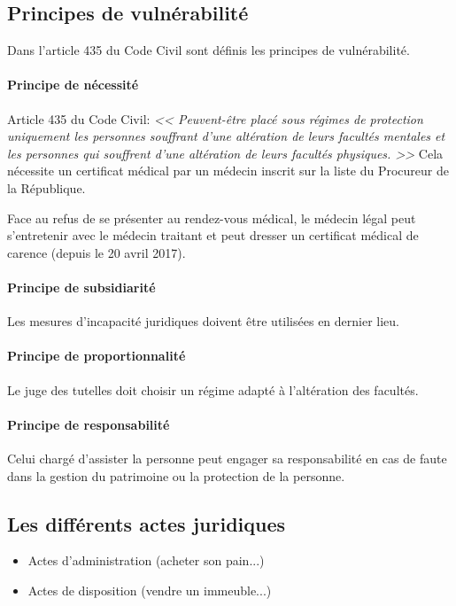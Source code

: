 \documentclass[10pt,a4paper]{article}
\begin{document}
\subsection{Principes de vulnérabilité}

Dans l'article 435 du Code Civil sont définis les principes de vulnérabilité.

\paragraph{Principe de nécessité} Article 435 du Code Civil: \textit{<< Peuvent-être placé sous régimes de protection uniquement les personnes souffrant d'une altération de leurs facultés mentales et les personnes qui souffrent d'une altération de leurs facultés physiques. >>} Cela nécessite un certificat médical par un médecin inscrit sur la liste du Procureur de la République.

Face au refus de se présenter au rendez-vous médical, le médecin légal peut s'entretenir avec le médecin traitant et peut dresser un certificat médical de carence (depuis le 20 avril 2017).

\paragraph{Principe de subsidiarité}
Les mesures d'incapacité juridiques doivent être utilisées en dernier lieu.

\paragraph{Principe de proportionnalité}

Le juge des tutelles doit choisir un régime adapté à l'altération des facultés.

\paragraph{Principe de responsabilité}

Celui chargé d'assister la personne peut engager sa responsabilité en cas de faute dans la gestion du patrimoine ou la protection de la personne.

\subsection{Les différents actes juridiques}

\begin{itemize}
\item Actes d'administration (acheter son pain...)
\item Actes de disposition (vendre un immeuble...)
\end{itemize}
\end{document}
